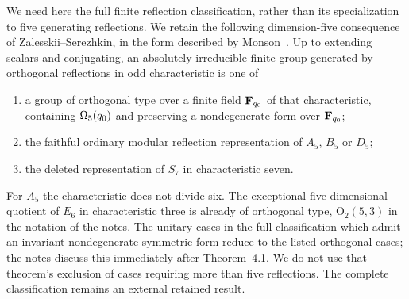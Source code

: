 \documentclass[11pt,a4paper]{article}
\begin{document}
We need here the full finite reflection classification, rather than
its specialization to five generating reflections. We retain the
following dimension-five consequence of Zalesskii--Serezhkin, in the
form described by Monson~\cite[pp.15--18]{M}. Up to extending scalars
and conjugating, an absolutely irreducible finite group generated by
orthogonal reflections in odd characteristic is one of
\begin{enumerate}
\item a group of orthogonal type over a finite field $\mathbf F_{q_0}$ of
that characteristic, containing $\Omega_5(q_0)$ and preserving a
nondegenerate form over $\mathbf F_{q_0}$;
\item the faithful ordinary modular reflection representation of
$A_5$, $B_5$ or $D_5$;
\item the deleted representation of $S_7$ in characteristic seven.
\end{enumerate}
For $A_5$ the characteristic does not divide six. The exceptional
five-dimensional quotient of $E_6$ in characteristic three is already
of orthogonal type, $\mathrm O_2(5,3)$ in the notation of the notes.
The unitary cases in the full classification which admit an invariant
nondegenerate symmetric form reduce to the listed orthogonal cases;
the notes discuss this immediately after Theorem~4.1. We do not use
that theorem's exclusion of cases requiring more than five reflections.
The complete classification remains an external retained result.
\end{document}
